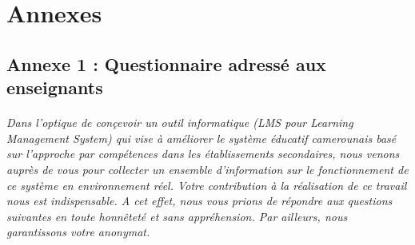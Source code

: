 \chapter*{Annexes}

\section*{Annexe 1 : Questionnaire adressé aux enseignants}

\subparagraph{Dans l'optique de conçevoir un outil informatique (LMS pour Learning Management System) qui vise à améliorer le système éducatif camerounais basé sur l'approche par compétences dans les établissements secondaires, nous venons auprès de vous pour collecter un ensemble d'information sur le fonctionnement de ce système en environnement réel. Votre contribution à la réalisation de ce travail nous est indispensable. A cet effet, nous vous prions de répondre aux questions suivantes en toute honnêteté et sans appréhension. Par ailleurs, nous garantissons votre anonymat.\\\\}

